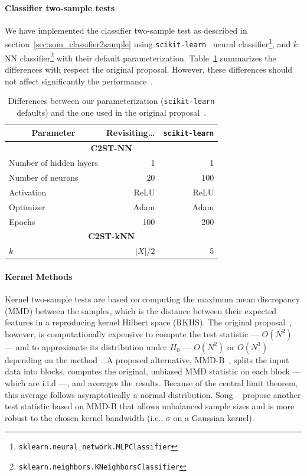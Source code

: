 \paragraph{Classifier two-sample tests}
We have implemented the classifier two-sample test as described in section~\ref{sec:som_classifier2sample}
using \texttt{scikit-learn}~\cite{scikit-learn} neural
classifier\footnote{\texttt{sklearn.neural\_network.MLPClassifier}},
and $k$NN classifier\footnote{\texttt{sklearn.neighbors.KNeighborsClassifier}}
with their default parameterization. Table~\ref{tab:classifier_diff} summarizes the differences
with respect the original proposal. However, these differences should not affect significantly
the performance~\cite{lopez2016revisiting}.

\begin{table}[htpb]
\centering
\begin{tabular}{lrr}
\multicolumn{1}{c}{\bfseries Parameter}       & \bfseries Revisiting\ldots & \texttt{scikit-learn}     \\ \hline
\multicolumn{3}{c}{\bfseries C2ST-NN} \\
Number of hidden layers &  1     &   1    \\
Number of neurons       & 20     & 100    \\
Activation              & ReLU   & ReLU   \\
Optimizer               & Adam   & Adam   \\
Epochs                  & 100    & 200    \\
\multicolumn{3}{c}{\bfseries C2ST-kNN} \\
$k$                     & $|X|/2$ & 5 \\
\end{tabular}
\caption[Differences between our parameterization]{
    Differences between our parameterization (\texttt{scikit-learn} defaults) and the one
    used in the original proposal~\cite{lopez2016revisiting}.
}
\label{tab:classifier_diff}
\end{table}

\paragraph{Kernel Methods}
Kernel two-sample tests are based on computing the maximum mean discrepancy (MMD) between the samples,
which is the distance between their expected features in a reproducing kernel Hilbert space (RKHS).
The original proposal~\cite{gretton2012kernel}, however, is computationally
expensive to compute the test statistic --- $O(N^2)$ --- and to approximate its distribution under
$H_0$ --- $O(N^2)$ or $O(N^3)$ depending on the method~\cite{zaremba2013b}.
A proposed alternative, MMD-B~\cite{zaremba2013b}, splits the input data into blocks, computes the original,
unbiased MMD statistic on each block --- which are i.i.d ---, and averages the results.
Because of the central limit theorem, this average follows asymptotically a normal distribution.
Song \etal~\cite{song2021fast} propose another test statistic based on MMD-B that allows
unbalanced sample sizes and is more robust to the chosen kernel bandwidth (i.e., $\sigma$ on a Gaussian kernel).

